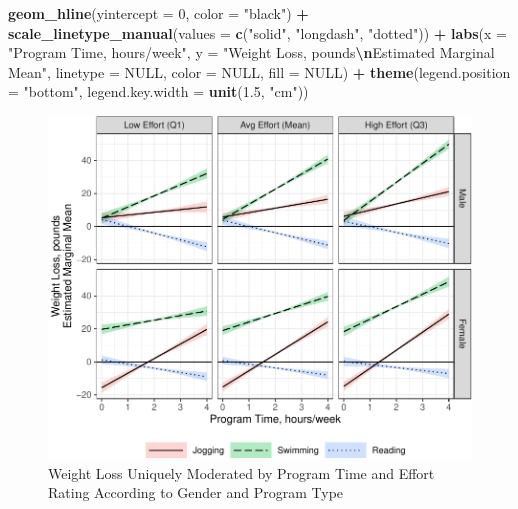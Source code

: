 \documentclass[
]{article}
\newenvironment{Shaded}{\begin{snugshade}}{\end{snugshade}}
\newcommand{\AttributeTok}[1]{\textcolor[rgb]{0.13,0.29,0.53}{#1}}
\newcommand{\ConstantTok}[1]{\textcolor[rgb]{0.56,0.35,0.01}{#1}}
\newcommand{\DecValTok}[1]{\textcolor[rgb]{0.00,0.00,0.81}{#1}}
\newcommand{\FloatTok}[1]{\textcolor[rgb]{0.00,0.00,0.81}{#1}}
\newcommand{\FunctionTok}[1]{\textcolor[rgb]{0.13,0.29,0.53}{\textbf{#1}}}
\newcommand{\NormalTok}[1]{#1}
\newcommand{\SpecialCharTok}[1]{\textcolor[rgb]{0.81,0.36,0.00}{\textbf{#1}}}
\newcommand{\StringTok}[1]{\textcolor[rgb]{0.31,0.60,0.02}{#1}}
\begin{document}
\begin{Shaded}
\begin{Highlighting}[]
  \FunctionTok{geom\_hline}\NormalTok{(}\AttributeTok{yintercept =} \DecValTok{0}\NormalTok{, }\AttributeTok{color =} \StringTok{"black"}\NormalTok{) }\SpecialCharTok{+}
  \FunctionTok{scale\_linetype\_manual}\NormalTok{(}\AttributeTok{values =} \FunctionTok{c}\NormalTok{(}\StringTok{"solid"}\NormalTok{, }\StringTok{"longdash"}\NormalTok{, }\StringTok{"dotted"}\NormalTok{)) }\SpecialCharTok{+}
  \FunctionTok{labs}\NormalTok{(}\AttributeTok{x =} \StringTok{"Program Time, hours/week"}\NormalTok{,}
       \AttributeTok{y =} \StringTok{"Weight Loss, pounds}\SpecialCharTok{\textbackslash{}n}\StringTok{Estimated Marginal Mean"}\NormalTok{,}
       \AttributeTok{linetype =} \ConstantTok{NULL}\NormalTok{,}
       \AttributeTok{color =} \ConstantTok{NULL}\NormalTok{,}
       \AttributeTok{fill =} \ConstantTok{NULL}\NormalTok{)  }\SpecialCharTok{+}
  \FunctionTok{theme}\NormalTok{(}\AttributeTok{legend.position =} \StringTok{"bottom"}\NormalTok{,}
        \AttributeTok{legend.key.width =} \FunctionTok{unit}\NormalTok{(}\FloatTok{1.5}\NormalTok{, }\StringTok{"cm"}\NormalTok{))}
\end{Highlighting}
\end{Shaded}

\begin{figure}[hb]

\includegraphics{Appendix_ex_weightloss_files/figure-latex/unnamed-chunk-83-1} \hfill{}

\caption{Weight Loss Uniquely Moderated by Program Time and Effort Rating According to Gender and Program Type}\label{fig:unnamed-chunk-83}
\end{figure}
\end{document}
